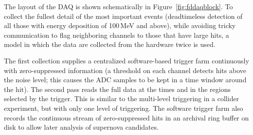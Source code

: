 The layout of the DAQ is shown schematically in
Figure~\ref{fig:fddaqblock}.  To collect the fullest detail of the
most important events (deadtimeless detection of all those with energy
deposition of 100\,MeV and above), while avoiding tricky communication
to flag neighboring channels to those that have large hits, a model
in which the data are collected from the hardware twice is used. 

The first collection
supplies a centralized software-based trigger farm continuously with
zero-suppressed information (a threshold on each channel detects hits
above the noise level; this causes the ADC samples to be kept in a
time window around the hit).  
The second pass reads the full data at the times and
in the regions %
selected by the
trigger. This is similar to the multi-level triggering in a collider experiment,
but with only one level of triggering.
The software trigger farm also
records the continuous stream of zero-suppressed hits in an archival
ring buffer on disk to allow later analysis of supernova candidates.

